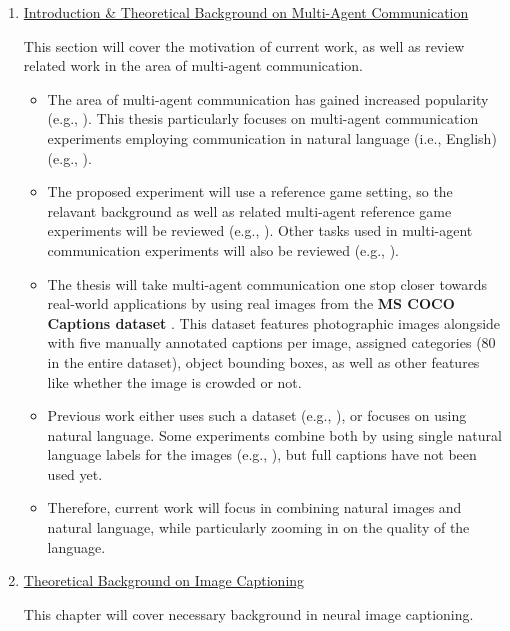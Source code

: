 \documentclass[11pt,letterpaper]{article}
\begin{document}
\begin{enumerate}	
\item \underline{Introduction \& Theoretical Background on Multi-Agent Communication}

This section will cover the motivation of current work,  as well as review related work in the area of multi-agent communication. 

\begin{itemize}
	\item The area of multi-agent communication has gained increased popularity (e.g., \cite{lazaridou2020emergent}). This thesis particularly focuses on multi-agent communication experiments employing communication in natural language (i.e., English) (e.g., \cite{andreas2016reasoning, mao2016generation, lazaridou2020multi, gupta2021dynamic}). 
	\item The proposed experiment will use a reference game setting, so the relavant background as well as related multi-agent reference game experiments will be reviewed (e.g., \cite{lazaridou2016multi}). Other tasks used in multi-agent communication experiments will also be reviewed (e.g., \cite{jaques2019social}).
	\item The thesis will take multi-agent communication one stop closer towards real-world applications by using real images from the \textbf{MS COCO Captions dataset} \cite{chen2015microsoft}. This dataset features photographic images alongside with five manually annotated captions per image, assigned categories (80 in the entire dataset), object bounding boxes, as well as other features like whether the image is crowded or not. 
	\item Previous work either uses such a dataset (e.g., \cite{havrylov2017emergence}), or focuses on using natural language. Some experiments combine both by using single natural language labels for the images (e.g., \cite{lazaridou2016multi}), but full captions have not been used yet.
	\item Therefore, current work will focus in combining natural images and natural language, while particularly zooming in on the quality of the language. 	
	
\end{itemize}

\item \underline{Theoretical Background on Image Captioning}

This chapter will cover necessary background in neural image captioning.  
 

\end{enumerate}
\end{document}
